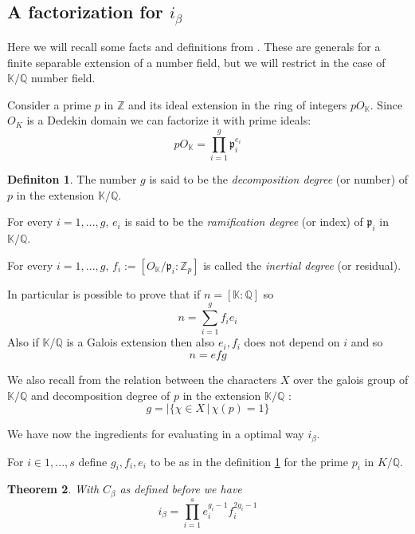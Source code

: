 \documentclass[]{article}
\theoremstyle{plain}
\newtheorem{teo}{Theorem}[section]
\theoremstyle{remark}
\theoremstyle{definition}
\newtheorem{deff}[teo]{Definiton}
\newcommand{\Z}{\mathbb{Z}}
\newcommand{\K}{\mathbb{K}}
\newcommand{\Q}{\mathbb{Q}}
\begin{document}
	\subsection{A factorization for $ i_\beta $}
	
	Here we will recall some facts and definitions from \cite[Chapter~11]{RIN}. These are generals for a finite separable extension of a number field, but we will restrict in the case of $ \K / \Q$ number field. 
	
	Consider a prime $ p $ in $ \Z $ and its ideal extension in the ring of integers $ pO_\K $. Since $ O_K $ is a Dedekin domain we can factorize it with prime ideals:
	\begin{equation}\label{eq:fact_p}
		pO_\K = \prod_{i=1}^g \mathfrak{p}_i^{e_i}
	\end{equation} 
	
	\begin{deff} \label{def:degree}
		The number $ g $ is said to be the \textit{decomposition degree} (or number) of $ p $ in the extension $ \K / \Q $.
		
		For every $ i=1, ..., g $, $ e_i $ is said to be the \textit{ramification degree} (or index) of $ \mathfrak{p}_i $ in $ \K / \Q $.
		
		For every $ i=1, ..., g $, $ f_i := [O_\K / \mathfrak{p}_i  : \Z_p ] $ is called the \textit{inertial degree} (or residual). 
	\end{deff}
	
	In particular is possible to prove that if $ n= [\K : \Q] $ so \[n = \sum_{i=1}^g f_i e_i\] Also if $ \K / \Q $ is a Galois extension then also $ e_i, f_i $ does not depend on $ i $ and so \[ n = efg \]
	
	We also recall from \cite[Theorem~3.7]{CF} the relation between the characters $ X $ over the galois group of $ \K/\Q $ and decomposition degree of $ p $ in the extension $ \K / \Q $ :
	\begin{equation}\label{eq:g_char}
		g = | \{ \chi \in X \,|\, \chi(p)=1 \}
	\end{equation}
	
	
	We have now the ingredients for evaluating in a optimal way $ i_\beta $. 
	
	For $ i\in {1 , ... , s} $ define $ g_i , f_i , e_i $ to be as in the definition \ref{def:degree} for the prime $ p_i$ in $ K /\Q $.
	
	\begin{tcolorbox}
		\begin{teo} \label{teo:idx_opt}
			With $ C_\beta $ as defined before we have 
			\[ i_\beta  =  \prod_{i=1}^s e_i^{g_i - 1} f_i ^{2 g_i - 1}\]
		\end{teo}
	\end{tcolorbox}
	
\end{document}
